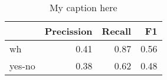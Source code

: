 \begin{table}[!ht]
\centering
\begin{tabular}{lrrr}
\toprule
{} &  Precission &  Recall &   F1 \\
\midrule
wh     &        0.41 &    0.87 & 0.56 \\
yes-no &        0.38 &    0.62 & 0.48 \\
\bottomrule
\end{tabular}
\caption{My caption here}
\label{tab:INTERROGATIVE-ocd-combined-F1}
\end{table}
